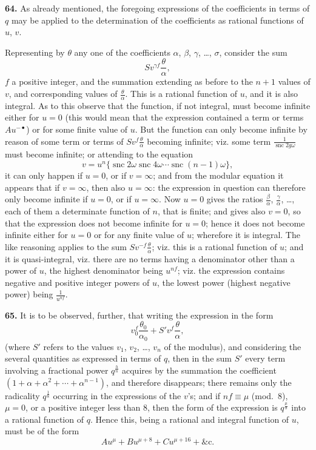 \documentclass[12pt,a4paper]{article}
\DeclareMathOperator{\snc}{snc}
\begin{document}
\textbf{64.} As already mentioned, the foregoing expressions of the coefficients in terms of $q$ may be applied to the determination of the coefficients as rational functions of $u$, $v$.

Representing by $\theta$ any one of the coefficients $\alpha$, $\beta$, $\gamma$, \ldots, $\sigma$, consider the sum
\[
S v^{\gamma f} \frac{\theta}{\alpha},
\]
$f$ a positive integer, and the summation extending as before to the $n + 1$ values of $v$, and corresponding values of $\frac{\theta}{\alpha}$. This is a rational function of $u$, and it is also integral. As to this observe that the function, if not integral, must become infinite either for $u = 0$ (this would mean that the expression contained a term or terms $Au^{-\bullet}$) or for some finite value of $u$. But the function can only become infinite by reason of some term or terms of $Sv^{f}\frac{\theta}{\alpha}$ becoming infinite; viz. some term $\frac{1}{\snc 2g\omega}$ must become infinite; or attending to the equation
\[
v = u^n\{\snc 2\omega \snc 4\omega \cdots \snc (n-1)\omega\},
\]
it can only happen if $u = 0$, or if $v = \infty$; and from the modular equation it appears that if $v = \infty$, then also $u = \infty$: the expression in question can therefore only become infinite if $u = 0$, or if $u = \infty$. Now $u = 0$ gives the ratios $\frac{\beta}{\alpha}$, $\frac{\gamma}{\alpha}$, \ldots, each of them a determinate function of $n$, that is finite; and gives also $v = 0$, so that the expression does not become infinite for $u = 0$; hence it does not become infinite either for $u = 0$ or for any finite value of $u$; wherefore it is integral. The like reasoning applies to the sum $Sv^{-f}\frac{\theta}{\alpha}$; viz. this is a rational function of $u$; and it is quasi-integral, viz. there are no terms having a denominator other than a power of $u$, the highest denominator being $u^{nf}$; viz. the expression contains negative and positive integer powers of $u$, the lowest power (highest negative power) being $\frac{1}{u^{nf}}$.

\textbf{65.} It is to be observed, further, that writing the expression in the form
\[
v_0^{\!f} \frac{\theta_0}{\alpha_0} + S' v^{\!f} \frac{\theta}{\alpha},
\]
(where $S'$ refers to the values $v_1$, $v_2$, \ldots, $v_n$ of the modulus), and considering the several quantities as expressed in terms of $q$, then in the sum $S'$ every term involving a fractional power $q^{\frac{h}{n}}$ acquires by the summation the coefficient $(1 + \alpha + \alpha^2 + \cdots + \alpha^{n-1})$, and therefore disappears; there remains only the radicality $q^{\frac{1}{8}}$ occurring in the expressions of the $v$'s; and if $nf \equiv \mu$ (mod.~8), $\mu = 0$, or a positive integer less than 8, then the form of the expression is $q^{\frac{\mu}{8}}$ into a rational function of $q$. Hence this, being a rational and integral function of $u$, must be of the form
\[
Au^{\mu} + Bu^{\mu+8} + Cu^{\mu+16} + \&\text{c.}
\]
\end{document}
